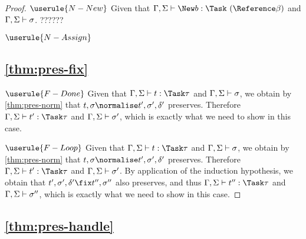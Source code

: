 \begin{proof}
\case
  {$\userule{N-New}$}
  {Given that $\Gamma,\Sigma\infers \New b:\Task\ (\Reference \beta)$ and $\Gamma,\Sigma\vdash\sigma$.
  ?????? 
  }

\case
  {$\userule{N-Assign}$}
  {}


\subsection{\cref{thm:pres-fix}}

\case
  {$\userule{F-Done}$}
  {Given that $\Gamma,\Sigma\infers t :\Task\tau$ and $\Gamma,\Sigma\vdash \sigma$, we obtain by \cref{thm:pres-norm} that $t,\sigma\normalise t',\sigma',\delta'$ preserves. Therefore $\Gamma,\Sigma\infers t':\Task\tau$ and $\Gamma,\Sigma\vdash\sigma'$, which is exactly what we need to show in this case.}

\case
  {$\userule{F-Loop}$}
  {Given that $\Gamma,\Sigma\infers t :\Task\tau$ and $\Gamma,\Sigma\vdash \sigma$, we obtain by \cref{thm:pres-norm} that $t,\sigma\normalise t',\sigma',\delta'$ preserves. Therefore $\Gamma,\Sigma\infers t':\Task\tau$ and $\Gamma,\Sigma\vdash\sigma'$.
  By application of the induction hypothesis, we obtain that $t',\sigma',\delta'\fix t'',\sigma''$ also preserves, and thus $\Gamma,\Sigma\infers t'':\Task\tau$ and $\Gamma,\Sigma\vdash\sigma''$, which is exactly what we need to show in this case.}
\end{proof}

\subsection{\cref{thm:pres-handle}}

